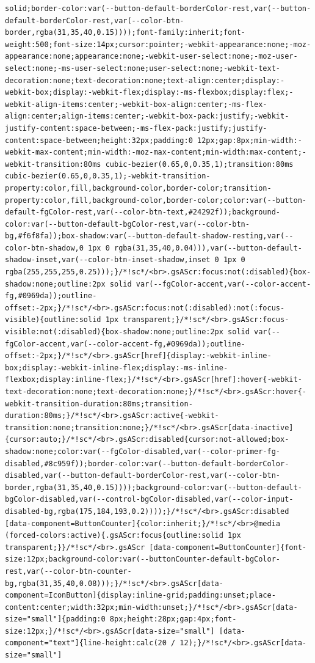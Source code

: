 \documentclass[
  letterpaper,
]{book}
\begin{document}
\begin{verbatim}
solid;border-color:var(--button-default-borderColor-rest,var(--button-default-borderColor-rest,var(--color-btn-border,rgba(31,35,40,0.15))));font-family:inherit;font-weight:500;font-size:14px;cursor:pointer;-webkit-appearance:none;-moz-appearance:none;appearance:none;-webkit-user-select:none;-moz-user-select:none;-ms-user-select:none;user-select:none;-webkit-text-decoration:none;text-decoration:none;text-align:center;display:-webkit-box;display:-webkit-flex;display:-ms-flexbox;display:flex;-webkit-align-items:center;-webkit-box-align:center;-ms-flex-align:center;align-items:center;-webkit-box-pack:justify;-webkit-justify-content:space-between;-ms-flex-pack:justify;justify-content:space-between;height:32px;padding:0 12px;gap:8px;min-width:-webkit-max-content;min-width:-moz-max-content;min-width:max-content;-webkit-transition:80ms cubic-bezier(0.65,0,0.35,1);transition:80ms cubic-bezier(0.65,0,0.35,1);-webkit-transition-property:color,fill,background-color,border-color;transition-property:color,fill,background-color,border-color;color:var(--button-default-fgColor-rest,var(--color-btn-text,#24292f));background-color:var(--button-default-bgColor-rest,var(--color-btn-bg,#f6f8fa));box-shadow:var(--button-default-shadow-resting,var(--color-btn-shadow,0 1px 0 rgba(31,35,40,0.04))),var(--button-default-shadow-inset,var(--color-btn-inset-shadow,inset 0 1px 0 rgba(255,255,255,0.25)));}/*!sc*/<br>.gsAScr:focus:not(:disabled){box-shadow:none;outline:2px solid var(--fgColor-accent,var(--color-accent-fg,#0969da));outline-offset:-2px;}/*!sc*/<br>.gsAScr:focus:not(:disabled):not(:focus-visible){outline:solid 1px transparent;}/*!sc*/<br>.gsAScr:focus-visible:not(:disabled){box-shadow:none;outline:2px solid var(--fgColor-accent,var(--color-accent-fg,#0969da));outline-offset:-2px;}/*!sc*/<br>.gsAScr[href]{display:-webkit-inline-box;display:-webkit-inline-flex;display:-ms-inline-flexbox;display:inline-flex;}/*!sc*/<br>.gsAScr[href]:hover{-webkit-text-decoration:none;text-decoration:none;}/*!sc*/<br>.gsAScr:hover{-webkit-transition-duration:80ms;transition-duration:80ms;}/*!sc*/<br>.gsAScr:active{-webkit-transition:none;transition:none;}/*!sc*/<br>.gsAScr[data-inactive]{cursor:auto;}/*!sc*/<br>.gsAScr:disabled{cursor:not-allowed;box-shadow:none;color:var(--fgColor-disabled,var(--color-primer-fg-disabled,#8c959f));border-color:var(--button-default-borderColor-disabled,var(--button-default-borderColor-rest,var(--color-btn-border,rgba(31,35,40,0.15))));background-color:var(--button-default-bgColor-disabled,var(--control-bgColor-disabled,var(--color-input-disabled-bg,rgba(175,184,193,0.2))));}/*!sc*/<br>.gsAScr:disabled [data-component=ButtonCounter]{color:inherit;}/*!sc*/<br>@media (forced-colors:active){.gsAScr:focus{outline:solid 1px transparent;}}/*!sc*/<br>.gsAScr [data-component=ButtonCounter]{font-size:12px;background-color:var(--buttonCounter-default-bgColor-rest,var(--color-btn-counter-bg,rgba(31,35,40,0.08)));}/*!sc*/<br>.gsAScr[data-component=IconButton]{display:inline-grid;padding:unset;place-content:center;width:32px;min-width:unset;}/*!sc*/<br>.gsAScr[data-size="small"]{padding:0 8px;height:28px;gap:4px;font-size:12px;}/*!sc*/<br>.gsAScr[data-size="small"] [data-component="text"]{line-height:calc(20 / 12);}/*!sc*/<br>.gsAScr[data-size="small"] 
\end{verbatim}
\end{document}
